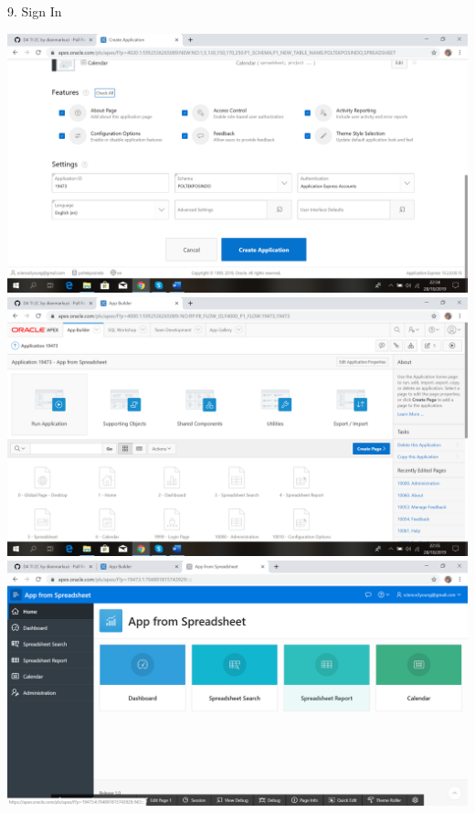 \documentclass{article}
\begin{document}
\item 9. Sign In
\begin{center}
  \includegraphics[width=10cm\textwidth]{gambar/13.png}
  \includegraphics[width=10cm\textwidth]{gambar/14.png}
  \includegraphics[width=10cm\textwidth]{gambar/15.png}
\end{center}
\end{document}
